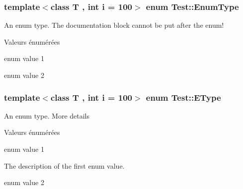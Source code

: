 \subsubsection[{Enum\+Type}]{\setlength{\rightskip}{0pt plus 5cm}template$<$class T , int i = 100$>$ enum {\bf Test\+::\+Enum\+Type}}\label{class_test_a26bf93efdaea3c6e2cfa4119c3755d3f}
An enum type. The documentation block cannot be put after the enum! \begin{Desc}
\item[Valeurs énumérées]\par
\begin{description}
\item[{\em 
\hypertarget{class_test_a26bf93efdaea3c6e2cfa4119c3755d3fac5f5895ba2af9a9fa16f6840a45d659c}{}E\+Val1\label{class_test_a26bf93efdaea3c6e2cfa4119c3755d3fac5f5895ba2af9a9fa16f6840a45d659c}
}]enum value 1 \item[{\em 
\hypertarget{class_test_a26bf93efdaea3c6e2cfa4119c3755d3fa565724e73b1352aaa0af531d8018167e}{}E\+Val2\label{class_test_a26bf93efdaea3c6e2cfa4119c3755d3fa565724e73b1352aaa0af531d8018167e}
}]enum value 2 \end{description}
\end{Desc}
\hypertarget{class_test_a0653c5125502203305b6fe839e99ed01}{}
\subsubsection[{E\+Type}]{\setlength{\rightskip}{0pt plus 5cm}template$<$class T , int i = 100$>$ enum {\bf Test\+::\+E\+Type}}\label{class_test_a0653c5125502203305b6fe839e99ed01}
An enum type. More details \begin{Desc}
\item[Valeurs énumérées]\par
\begin{description}
\item[{\em 
\hypertarget{class_test_ad8d13fe56b896633273087859b89a1a3af621232782128e49458adf9069e126d4}{}Val1\label{class_test_ad8d13fe56b896633273087859b89a1a3af621232782128e49458adf9069e126d4}
}]enum value 1

The description of the first enum value. \item[{\em 
\hypertarget{class_test_ad8d13fe56b896633273087859b89a1a3a218603a97012ef8dce0b798d598b2866}{}Val2\label{class_test_ad8d13fe56b896633273087859b89a1a3a218603a97012ef8dce0b798d598b2866}
}]enum value 2 \end{description}
\end{Desc}
\hypertarget{class_test_ad8d13fe56b896633273087859b89a1a3}{}
